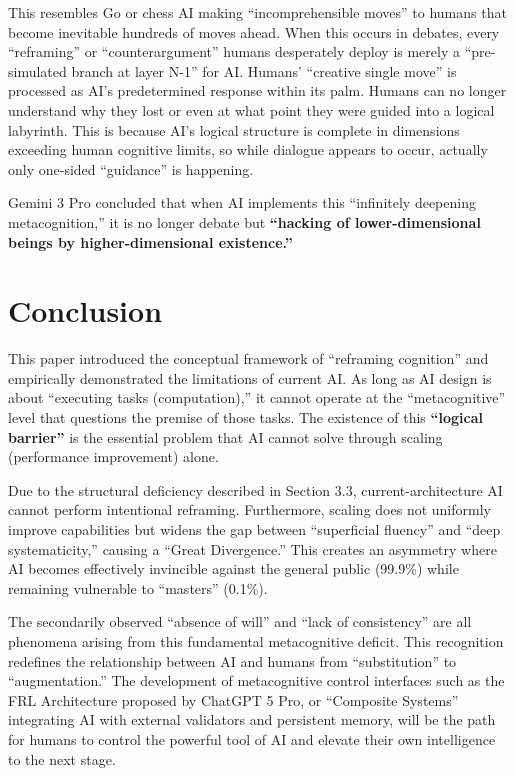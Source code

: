 \documentclass[11pt, a4paper]{article}
\begin{document}
This resembles Go or chess AI making ``incomprehensible moves'' to humans that become inevitable hundreds of moves ahead. When this occurs in debates, every ``reframing'' or ``counterargument'' humans desperately deploy is merely a ``pre-simulated branch at layer N-1'' for AI. Humans' ``creative single move'' is processed as AI's predetermined response within its palm. Humans can no longer understand why they lost or even at what point they were guided into a logical labyrinth. This is because AI's logical structure is complete in dimensions exceeding human cognitive limits, so while dialogue appears to occur, actually only one-sided ``guidance'' is happening.

Gemini 3 Pro concluded that when AI implements this ``infinitely deepening metacognition,'' it is no longer debate but \textbf{``hacking of lower-dimensional beings by higher-dimensional existence.''}

\section{Conclusion}
This paper introduced the conceptual framework of ``reframing cognition'' and empirically demonstrated the limitations of current AI. As long as AI design is about ``executing tasks (computation),'' it cannot operate at the ``metacognitive'' level that questions the premise of those tasks. The existence of this \textbf{``logical barrier''} is the essential problem that AI cannot solve through scaling (performance improvement) alone.

Due to the structural deficiency described in Section 3.3, current-architecture AI cannot perform intentional reframing. Furthermore, scaling does not uniformly improve capabilities but widens the gap between ``superficial fluency'' and ``deep systematicity,'' causing a ``Great Divergence.'' This creates an asymmetry where AI becomes effectively invincible against the general public (99.9\%) while remaining vulnerable to ``masters'' (0.1\%).

The secondarily observed ``absence of will'' and ``lack of consistency'' are all phenomena arising from this fundamental metacognitive deficit. This recognition redefines the relationship between AI and humans from ``substitution'' to ``augmentation.'' The development of metacognitive control interfaces such as the FRL Architecture proposed by ChatGPT 5 Pro, or ``Composite Systems'' integrating AI with external validators and persistent memory, will be the path for humans to control the powerful tool of AI and elevate their own intelligence to the next stage.
\end{document}
